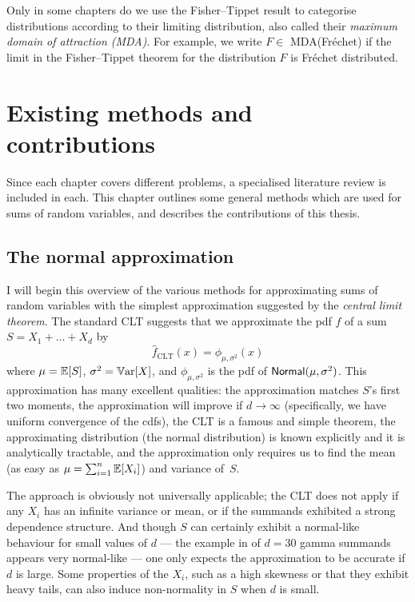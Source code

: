 Only in some chapters do we use the Fisher--Tippet result to categorise distributions according to their limiting distribution, also called their \emph{maximum domain of attraction (MDA)}. For example, we write $F \in$ \textsf{MDA(Fr\'echet)} if the limit in the Fisher--Tippet theorem for the distribution $F$ is Fr{\'e}chet distributed.

\section{Existing methods and contributions}

Since each chapter covers different problems, a specialised literature review is included in each. This chapter outlines some general methods which are used for sums of random variables, and describes the contributions of this thesis.

\subsection{The normal approximation}

I will begin this overview of the various methods for approximating sums of random variables with the simplest approximation suggested by the \emph{central limit theorem}. The standard CLT suggests that we approximate the pdf $f$ of a sum $S = X_1 + \dots + X_d$ by
\[ \hat{f}_{\mathrm{CLT}}(x) = \phi_{\mu,\sigma^2}(x) \]
where $\mu=\operatorname{{\mathbb E}}[S]$, $\sigma^2=\operatorname{\mathbb{V}\mathrm{ar}}[X]$, and $\phi_{\mu,\sigma^2}$ is the pdf of $\mathsf{Normal}(\mu,\sigma^2)$.
This approximation has many excellent qualities: the approximation matches $S$'s first two moments, the approximation will improve if $d \to \infty$ (specifically, we have uniform convergence of the cdfs), the CLT is a famous and simple theorem, the approximating distribution (the normal distribution) is known explicitly and it is analytically tractable, and the approximation only requires us to find the mean (as easy as $\mu = \sum_{i=1}^n \operatorname{{\mathbb E}}[X_i]$) and variance of~$S$.

The approach is obviously not universally applicable; the CLT does not apply if any $X_i$ has an infinite variance or mean, or if the summands exhibited a strong dependence structure. And though $S$ can certainly exhibit a normal-like behaviour for small values of $d$ --- the example in  of $d=30$ gamma summands appears very normal-like --- one only expects the approximation to be accurate if $d$ is large. Some properties of the $X_i$, such as a high skewness or that they exhibit heavy tails, can also induce non-normality in $S$ when $d$ is small.


